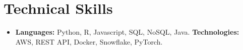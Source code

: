 \documentclass[letterpaper,10pt]{article}
\newcommand{\resumeSubHeadingListStart}{\begin{itemize}[leftmargin=*]}
\newcommand{\resumeSubHeadingListEnd}{\end{itemize}}
\begin{document}
\section{Technical Skills}
	\resumeSubHeadingListStart
	\item{
		\textbf{Languages: }{Python, R, Javascript, SQL, NoSQL, Java.}
		\hfill
		\textbf{Technologies: }{AWS, REST API, Docker, Snowflake, PyTorch.}
	}
	\resumeSubHeadingListEnd

\end{document}
